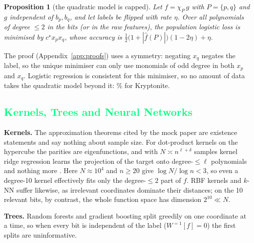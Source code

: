 \documentclass{article}
\newcommand{\csubsection}[1]{\subsection{\textcolor{springgreen}{#1}}}
\theoremstyle{plain}
\newtheorem{proposition}{Proposition}
\begin{document}
\begin{proposition}[the quadratic model is capped]
\label{prop:quad}
Let $f=\chi_P\,g$ with $P=\{p,q\}$ and $g$ independent of $b_p,b_q$, and let labels be flipped with rate $\eta$. Over all polynomials of degree $\le2$ in the bits (or in the raw features), the population logistic loss is minimised by $c^\star x_px_q$, whose accuracy is $\frac12\bigl(1+|\hat f(P)|\bigr)(1-2\eta)+\eta$.
\end{proposition}
The proof (Appendix~\ref{app:proofs}) uses a symmetry: negating $x_q$ negates the label, so the unique minimiser can only use monomials of odd degree in both $x_p$ and $x_q$. Logistic regression is consistent for this minimiser, so no amount of data takes the quadratic model beyond it: \LimitTwo\% for Kryptonite.

\csubsection{Kernels, Trees and Neural Networks}
\label{sec:method-learners}
\textbf{Kernels.} The approximation theorems cited by the mock paper \citep{debranges1959stone,hornik1991approximation} are existence statements and say nothing about sample size. For dot-product kernels on the hypercube the parities are eigenfunctions, and with $N\asymp n^{\ell+\delta}$ samples kernel ridge regression learns the projection of the target onto degree-$\le\ell$ polynomials and nothing more \citep{ghorbani2021linearized,mei2022generalization}. Here $N\approx10^4$ and $n\ge20$ give $\log N/\log n<3$, so even a degree-10 kernel effectively fits only the degree-$\le2$ part of $f$. RBF kernels and $k$-NN suffer likewise, as irrelevant coordinates dominate their distances; on the 10 relevant bits, by contrast, the whole function space has dimension $2^{10}\ll N$.

\textbf{Trees.} Random forests \citep{breiman2001random} and gradient boosting split greedily on one coordinate at a time, so when every bit is independent of the label ($W^{=1}[f]=0$) the first splits are uninformative.
\end{document}
